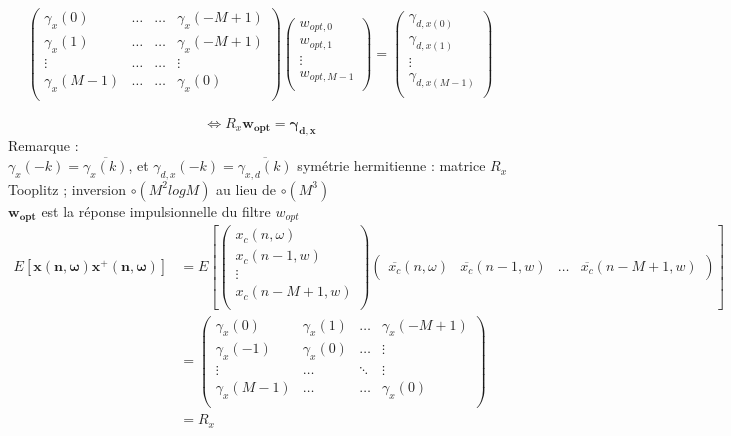 \documentclass[12pt]{article}
\begin{document}
\begin{align}
\begin{pmatrix}
    \gamma_x(0) & \dots & \dots & \gamma_x(-M+1) \\
    \gamma_x(1) & \dots & \dots & \gamma_x(-M+1) \\
    \vdots & \dots & \dots & \vdots \\
    \gamma_x(M-1) & \dots & \dots & \gamma_x(0) \\
\end{pmatrix}
\begin{pmatrix}
    w_{opt,0} \\
    w_{opt,1} \\
    \vdots \\
    w_{opt,M-1} \\
\end{pmatrix}
=
\begin{pmatrix}
    \gamma_{d,x(0)} \\
    \gamma_{d,x(1)} \\
    \vdots \\
    \gamma_{d,x(M-1)} \\
\end{pmatrix} \nonumber
\end{align}

\begin{equation}
    \Leftrightarrow R_x \mathbf{w_{opt}} = \mathbf{\gamma_{d,x}} \nonumber
\end{equation}
Remarque : \\
$\gamma_x(-k) = \overline{\gamma_x(k)}$, et $\gamma_{d,x}(-k) = \overline{\gamma_{x,d}(k)}$ symétrie hermitienne : matrice $R_x$ Tooplitz ; inversion $\circ (M^2logM)$ au lieu de $\circ (M^3)$\\
$\mathbf{w_{opt}}$ est la réponse impulsionnelle du filtre $w_{opt}$\\
\begin{align}
    E[\mathbf{x(n,\omega)}\mathbf{x^+(n,\omega)}]
    &= E\left[
    \begin{pmatrix}
        x_c(n,\omega) \\
        x_c(n-1,w) \\
        \vdots \\
        x_c(n-M+1,w) \\
    \end{pmatrix}
    \begin{pmatrix}
        \overline{x_c}(n,\omega) & \overline{x_c}(n-1,w) & \dots & \overline{x_c}(n-M+1,w)
    \end{pmatrix}
    \right] \nonumber \\
    &=  
    \begin{pmatrix}
        \gamma_x(0) & \gamma_x(1) & \dots & \gamma_x(-M+1) \\
        \gamma_x(-1) & \gamma_x(0) & \dots & \vdots \\
        \vdots & \dots & \ddots & \vdots \\
        \gamma_x(M-1) & \dots & \dots & \gamma_x(0) \\
    \end{pmatrix} \nonumber  \\
    &= R_x \nonumber
\end{align}
\end{document}
